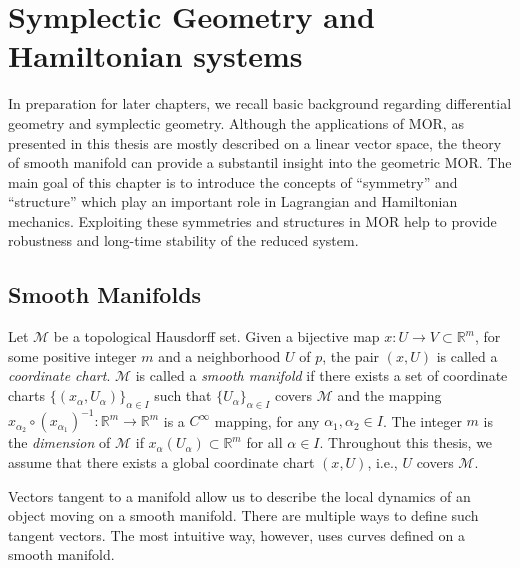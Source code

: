 \chapter{Symplectic Geometry and Hamiltonian systems} \label{chapter:2}

In preparation for later chapters, we recall basic background regarding differential geometry and symplectic geometry. Although the applications of MOR, as presented in this thesis are mostly described on a linear vector space, the theory of smooth manifold can provide a substantil insight into the geometric MOR. The main goal of this chapter is to introduce the concepts of ``symmetry'' and ``structure'' which play an important role in Lagrangian and Hamiltonian mechanics. Exploiting these symmetries and structures in MOR help to provide robustness and long-time stability of the reduced system.

\section{Smooth Manifolds} \label{section:2.1}
Let $\mathcal M$ be a topological Hausdorff \cite{friedman1970foundations} set. Given a bijective map $x:U\to V\subset \mathbb R^{m}$, for some positive integer $m$ and a neighborhood $U$ of $p$, the pair $(x,U)$ is called a \emph{coordinate chart}. $\mathcal M$ is called a \emph{smooth manifold} if there exists a set of coordinate charts $\{(x_{\alpha},U_{\alpha})\}_{\alpha\in I}$ such that $\{U_{\alpha}\}_{\alpha\in I}$ covers $\mathcal M$ and the mapping $x_{\alpha_2}\circ (x_{\alpha_1})^{-1}:\mathbb R^{m} \to \mathbb R^{m}$ is a $C^{\infty}$ mapping, for any $\alpha_1,\alpha_2\in I$. The integer $m$ is the \emph{dimension} of $\mathcal M$ if $x_{\alpha}(U_{\alpha}) \subset \mathbb R^{m}$ for all $\alpha \in I$. Throughout this thesis, we assume that there exists a global coordinate chart $(x,U)$, i.e., $U$ covers $\mathcal M$.

Vectors tangent to a manifold allow us to describe the local dynamics of an object moving on a smooth manifold. There are multiple ways to define such tangent vectors. The most intuitive way, however, uses curves defined on a smooth manifold.

